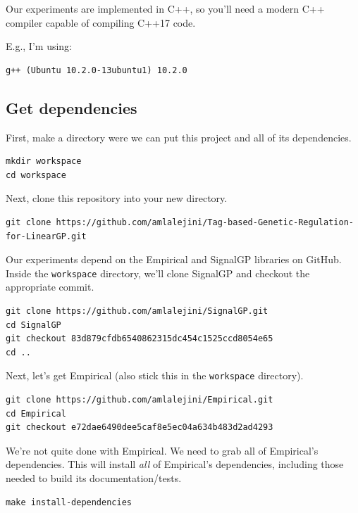 \documentclass[]{book}
\begin{document}
Our experiments are implemented in C++, so you'll need a modern C++ compiler capable of compiling C++17 code.

E.g., I'm using:

\begin{verbatim}
g++ (Ubuntu 10.2.0-13ubuntu1) 10.2.0
\end{verbatim}

\hypertarget{get-dependencies}{%
\subsection{Get dependencies}\label{get-dependencies}}

First, make a directory were we can put this project and all of its dependencies.

\begin{verbatim}
mkdir workspace
cd workspace
\end{verbatim}

Next, clone this repository into your new directory.

\begin{verbatim}
git clone https://github.com/amlalejini/Tag-based-Genetic-Regulation-for-LinearGP.git
\end{verbatim}

Our experiments depend on the Empirical and SignalGP libraries on GitHub.
Inside the \texttt{workspace} directory, we'll clone SignalGP and checkout the appropriate commit.

\begin{verbatim}
git clone https://github.com/amlalejini/SignalGP.git
cd SignalGP
git checkout 83d879cfdb6540862315dc454c1525ccd8054e65
cd ..
\end{verbatim}

Next, let's get Empirical (also stick this in the \texttt{workspace} directory).

\begin{verbatim}
git clone https://github.com/amlalejini/Empirical.git
cd Empirical
git checkout e72dae6490dee5caf8e5ec04a634b483d2ad4293
\end{verbatim}

We're not quite done with Empirical. We need to grab all of Empirical's dependencies. This will install \emph{all} of Empirical's dependencies, including those needed to build its documentation/tests.

\begin{verbatim}
make install-dependencies
\end{verbatim}
\end{document}
